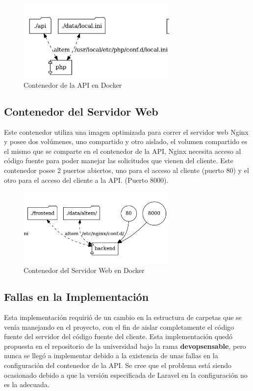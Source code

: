 \begin{figure}[H]
    \centering
    \includegraphics[width=0.7\textwidth]{img/api_container.png}
    \caption{Contenedor de la API en Docker}
\end{figure}

\subsection{Contenedor del Servidor Web}
Este contenedor utiliza una imagen optimizada para correr el servidor web Nginx y posee dos volúmenes, uno compartido y otro aislado, el volumen compartido es el mismo que se comparte en el contenedor de la API, Nginx necesita acceso al código fuente para poder manejar las solicitudes que vienen del cliente. Este contenedor posee 2 puertos abiertos, uno para el acceso al cliente (puerto 80) y el otro para el acceso del cliente a la API. (Puerto 8000).

\begin{figure}[H]
    \centering
    \includegraphics[width=0.7\textwidth]{img/ws_container.png}
    \caption{Contenedor del Servidor Web en Docker}
\end{figure}

\subsection{Fallas en la Implementación}
Esta implementación requirió de un cambio en la estructura de carpetas que se venía manejando en el proyecto, con el fin de aislar completamente el código fuente del servidor del código fuente del cliente. 
Esta implementación quedó propuesta en el repositorio de la universidad bajo la rama \textbf{devopsensable}, pero nunca se llegó a implementar debido a la existencia de unas fallas en la configuración del contenedor de la API. Se cree que el problema está siendo ocasionado debido a que la versión especificada de Laravel en la configuración no es la adecuada.
